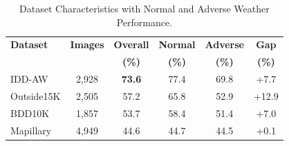 \begin{table}[t]
\centering
\caption{Dataset Characteristics with Normal and Adverse Weather Performance.}
\label{tab:dataset_summary}
\begin{tabular}{@{}lccccc@{}}
\toprule
\textbf{Dataset} & \textbf{Images} & \textbf{Overall} & \textbf{Normal} & \textbf{Adverse} & \textbf{Gap} \\
 & & \textbf{(\%)} & \textbf{(\%)} & \textbf{(\%)} & \textbf{(\%)} \\
\midrule
IDD-AW      & 2,928 & \textbf{73.6} & 77.4 & 69.8 & +7.7 \\
Outside15K  & 2,505 & 57.2 & 65.8 & 52.9 & +12.9 \\
BDD10K      & 1,857 & 53.7 & 58.4 & 51.4 & +7.0 \\
Mapillary   & 4,949 & 44.6 & 44.7 & 44.5 & +0.1 \\
\bottomrule
\end{tabular}
\end{table}



